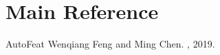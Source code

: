 \documentclass[letterpaper,11pt,english]{sphinxmanual}
\begin{document}
\chapter{Main Reference}
\label{\detokenize{reference:main-reference}}\label{\detokenize{reference:reference}}\label{\detokenize{reference::doc}}
\begin{sphinxthebibliography}{AutoFeat}
\sphinxAtStartPar
Wenqiang Feng and Ming Chen.
, 2019.
\end{sphinxthebibliography}



\renewcommand{\indexname}{Index}
\printindex
\end{document}
